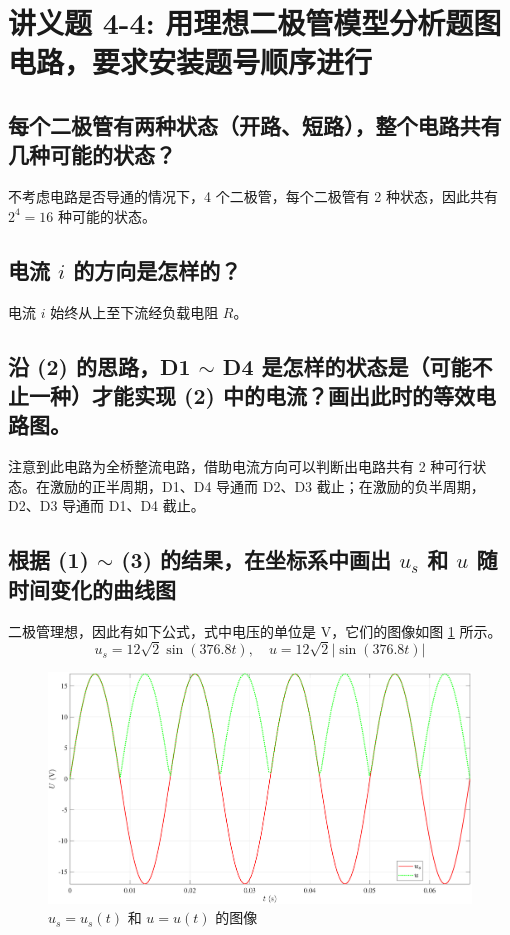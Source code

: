 \documentclass[UTF8]{report}
\theoremstyle{MyLineTheoremStyle} %
\theoremstyle{MyBlockTheoremStyle} %
\theoremstyle{MySubsubsectionStyle} %
\begin{document}
\section{讲义题 4-4: 用理想二极管模型分析题图电路，要求安装题号顺序进行}
\subsection{每个二极管有两种状态（开路、短路），整个电路共有几种可能的状态？}
不考虑电路是否导通的情况下，4 个二极管，每个二极管有 2 种状态，因此共有 $2^4 = 16$ 种可能的状态。

\subsection{电流 $i$ 的方向是怎样的？}
电流 $i$ 始终从上至下流经负载电阻 $R$。

\subsection{沿 (2) 的思路，D1 $\sim$ D4 是怎样的状态是（可能不止一种）才能实现 (2) 中的电流？画出此时的等效电路图。}
注意到此电路为全桥整流电路，借助电流方向可以判断出电路共有 2 种可行状态。在激励的正半周期，D1、D4 导通而 D2、D3 截止；在激励的负半周期，D2、D3 导通而 D1、D4 截止。

\subsection{根据 (1) $\sim$ (3) 的结果，在坐标系中画出 $u_s$ 和 $u$ 随时间变化的曲线图}
二极管理想，因此有如下公式，式中电压的单位是 V，它们的图像如图 \ref{理想图像} 所示。
\begin{equation}
u_s = 12 \sqrt{2} \sin (376.8 t),\quad u = 12 \sqrt{2}  \left| \sin (376.8 t) \right| 
\end{equation}
\begin{figure}[H]\centering
\includegraphics[width=0.75\columnwidth]{assets/7/2024-10-17_00-07-30.pdf}
\caption{$u_s = u_s(t)$ 和 $u = u(t)$ 的图像}\label{理想图像}
\end{figure}
\end{document}
